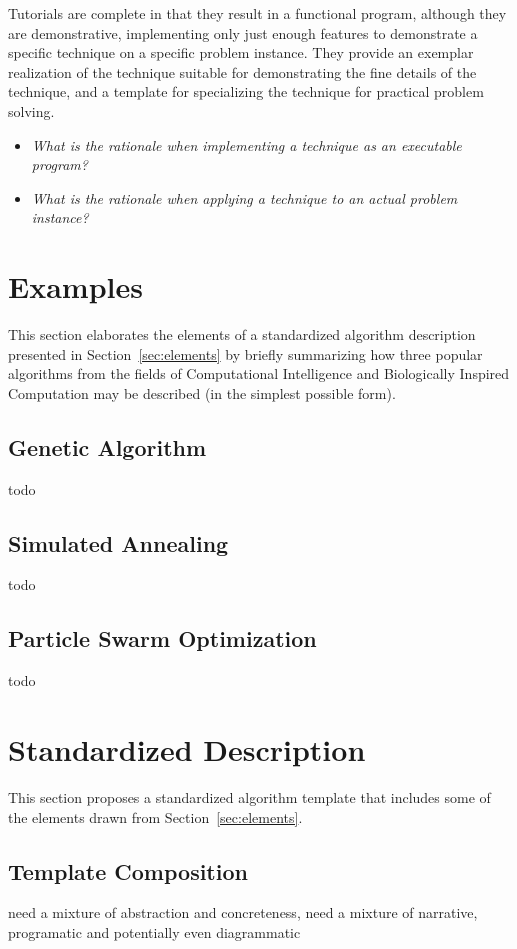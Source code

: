 \documentclass[a4paper, 11pt]{article}
\begin{document}
Tutorials are complete in that they result in a functional program, although they are demonstrative, implementing only just enough features to demonstrate a specific technique on a specific problem instance. They provide an exemplar realization of the technique suitable for demonstrating the fine details of the technique, and a template for specializing the technique for practical problem solving. 

\begin{itemize}
	\item \emph{What is the rationale when implementing a technique as an executable program?}
	\item \emph{What is the rationale when applying a technique to an actual problem instance?}
\end{itemize}

\section{Examples} 
\label{sec:examples}
This section elaborates the elements of a standardized algorithm description presented in Section~\ref{sec:elements} by briefly summarizing how three popular algorithms from the fields of Computational Intelligence and Biologically Inspired Computation may be described (in the simplest possible form).

\subsection{Genetic Algorithm}
todo

\subsection{Simulated Annealing}
todo

\subsection{Particle Swarm Optimization}
todo

\section{Standardized Description} 
\label{sec:template}
This section proposes a standardized algorithm template that includes some of the elements drawn from Section~\ref{sec:elements}.

\subsection{Template Composition}
need a mixture of abstraction and concreteness, need a mixture of narrative, programatic and potentially even diagrammatic 
\end{document}
